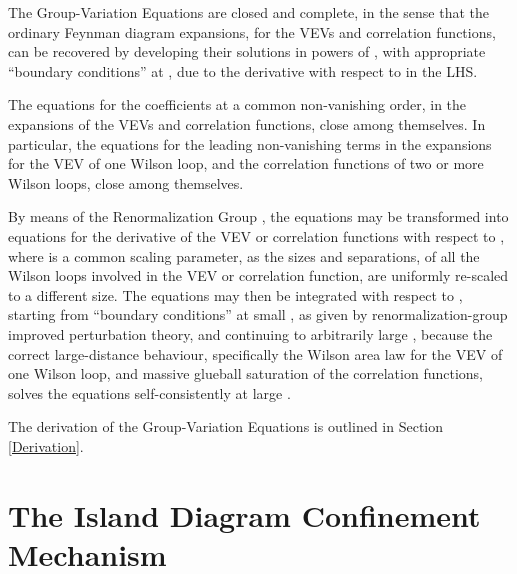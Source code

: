 \documentclass[a4paper,12pt,oneside]{article}
\begin{document}
The Group-Variation Equations are closed and complete, in the sense that the
ordinary Feynman diagram expansions, for the VEVs and correlation functions,
can be recovered by developing their solutions in powers of \coordHE{}, with
appropriate ``boundary conditions'' at \coordHE{}, due to the derivative with
respect to \coordHE{} in the LHS.

The equations for the coefficients at a common
non-vanishing order, in the \coordHE{} expansions of the VEVs and correlation
functions, close among themselves.  In particular, the equations for the
leading non-vanishing terms in the \coordHE{} expansions for the VEV of one
Wilson loop, and the correlation functions of two or more Wilson loops,
close among themselves.

By means of the Renormalization Group \cite{RGE}, the equations may be transformed into
equations for the derivative of the VEV or correlation functions with
respect to \coordHE{}, where \coordHE{} is a common scaling parameter, as the sizes
and separations, of all the Wilson loops involved in the VEV or correlation
function, are uniformly re-scaled to a different size.  The equations may
then be integrated with respect to \coordHE{}, starting from ``boundary conditions''
at small \coordHE{}, as given by renormalization-group improved perturbation
theory, and continuing to arbitrarily large \coordHE{}, because the correct
large-distance behaviour, specifically the Wilson area law \cite{Wilson} for the VEV of
one Wilson loop, and massive glueball saturation of the correlation
functions, solves the equations self-consistently at large \coordHE{}.

The derivation of the Group-Variation Equations is outlined in Section 
\ref{Derivation}.

\section{The Island Diagram Confinement Mechanism}
\end{document}
